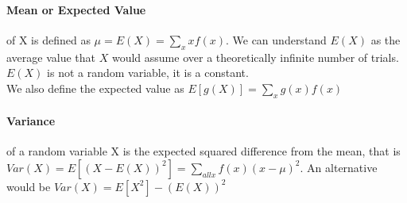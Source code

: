     \paragraph{Mean or Expected Value} of X is defined as $\mu = E(X) = \sum_x
    xf(x)$. We can understand $E(X)$ as the average value that $X$ would assume
    over a theoretically infinite number of trials. $E(X)$ is not a random
    variable, it is a constant.\\
    We also define the expected value as $E[g(X)] = \sum_x g(x)f(x)$

    \paragraph{Variance} of a random variable X is the expected squared
    difference from the mean, that is $Var(X) = E[(X - E(X))^2] = \sum_{all x}
    f(x)(x-\mu)^2$. An alternative would be $Var(X) = E[X^2] - (E(X))^2$
